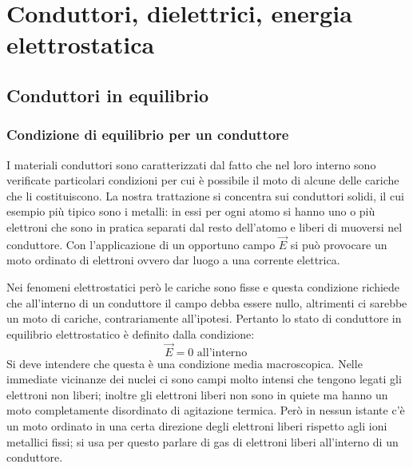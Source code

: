 \documentclass[class=book, crop=false, oneside, 12pt]{standalone}
\begin{document}
\chapter{Conduttori, dielettrici, energia elettrostatica}

\section{Conduttori in equilibrio}

\subsection{Condizione di equilibrio per un conduttore}

I materiali conduttori sono caratterizzati dal fatto che nel loro interno sono verificate particolari condizioni per cui è possibile il moto di alcune delle cariche che li costituiscono.  
La nostra trattazione si concentra sui conduttori solidi, il cui esempio più tipico sono i metalli: in essi per ogni atomo si hanno uno o più elettroni che sono in pratica separati dal resto dell'atomo e liberi di muoversi nel conduttore. 
Con l'applicazione di un opportuno campo \(\overrightarrow{E}\) si può provocare un moto ordinato di elettroni ovvero dar luogo a una corrente elettrica.

Nei fenomeni elettrostatici però le cariche sono fisse e questa condizione richiede che all'interno di un conduttore il campo debba essere nullo, altrimenti ci sarebbe un moto di cariche, contrariamente all'ipotesi. 
Pertanto lo stato di conduttore in equilibrio elettrostatico è definito dalla condizione: 
\begin{equation*}
    \overrightarrow{E} = 0 \text{ all'interno }
\end{equation*}
Si deve intendere che questa è una condizione media macroscopica. 
Nelle immediate vicinanze dei nuclei ci sono campi molto intensi che tengono legati gli elettroni non liberi; inoltre gli elettroni liberi non sono in quiete ma hanno un moto completamente disordinato di agitazione termica. 
Però in nessun istante c'è un moto ordinato in una certa direzione degli elettroni liberi rispetto agli ioni metallici fissi; si usa per questo parlare di gas di elettroni liberi all'interno di un conduttore.
\end{document}

